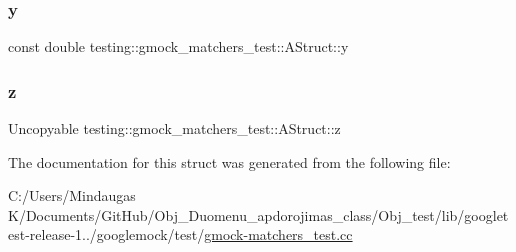 \subsubsection{\texorpdfstring{y}{y}}
{\footnotesize\ttfamily const double testing\+::gmock\+\_\+matchers\+\_\+test\+::\+A\+Struct\+::y}

\mbox{\label{structtesting_1_1gmock__matchers__test_1_1_a_struct_a45b1006e4a7b21037610a385dcae6d8c}} 
\subsubsection{\texorpdfstring{z}{z}}
{\footnotesize\ttfamily Uncopyable testing\+::gmock\+\_\+matchers\+\_\+test\+::\+A\+Struct\+::z}



The documentation for this struct was generated from the following file\+:\begin{DoxyCompactItemize}
\item 
C\+:/\+Users/\+Mindaugas K/\+Documents/\+Git\+Hub/\+Obj\+\_\+\+Duomenu\+\_\+apdorojimas\+\_\+class/\+Obj\+\_\+test/lib/googletest-\/release-\/1../googlemock/test/\mbox{\hyperlink{_obj__test_2lib_2googletest-release-1_88_81_2googlemock_2test_2gmock-matchers__test_8cc}{gmock-\/matchers\+\_\+test.\+cc}}\end{DoxyCompactItemize}
